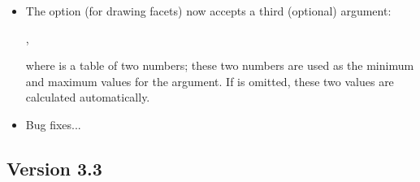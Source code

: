 \begin{itemize}
    \item  The  option (for drawing facets) now accepts a third (optional) argument:\par\hfil {},\hfil\par
     where  is a table of two numbers; these two numbers are used as the minimum and maximum values ​​for the  argument. If  is omitted, these two values ​​are calculated automatically.
    
    \item Bug fixes...
\end{itemize}

\subsection{Version 3.3}

